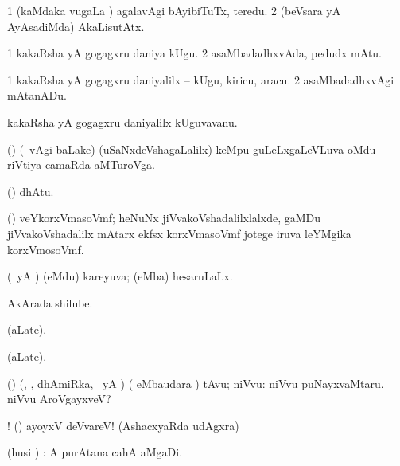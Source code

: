 \bentry
{} 
\gl{\kirxvi} 
\bmng
\bnum
\num{1} (kaMdaka \mo vugaLa \vi) agalavAgi bAyibiTuTx, teredu. 
\num{2} (beVsara yA AyAsadiMda) AkaLisutAtx.
\enum
\emng
\eentry

\bentry
{} 
\gl{\nA} 
\bmng
\bnum
\num{1} kakaRsha yA gogagxru daniya kUgu. 
\num{2} asaMbadadhxvAda, pedudx  mAtu.
\enum
\emng
\eentry

\bentry
{} 
\gl{\akirx} 
\bmng
\bnum
\num{1} kakaRsha yA gogagxru daniyalilx -- kUgu, kiricu, aracu. 
\num{2} asaMbadadhxvAgi mAtanADu.
\enum
\emng 
\eentry

\bentry
{} 
\gl{\nA} 
\bmng
kakaRsha yA gogagxru daniyalilx kUguvavanu.
\emng
\eentry

\bentry
{} 
\gl{\nA} 
\bmng
(\bava) (\sA\  \Eva vAgi baLake) (uSaNxdeVshagaLalilx) keMpu guLeLxgaLeVLuva oMdu riVtiya camaRda aMTuroVga.
\emng
\eentry

\bentry
{}
\gl{\saMkeV}
\bmng
(\ravi)  dhAtu.
\emng
\eentry

\bentry
{} 
\gl{\nA}
\bmng
(\jiVvi) veYkorxVmasoVmf; heNuNx jiVvakoVshadalilxlalxde, gaMDu jiVvakoVshadalilx mAtarx  ekfsx korxVmasoVmf jotege iruva leYMgika korxVmosoVmf.
\emng
\eentry

\bentry
{} 
\gl{\gu}
\bmng
(\pArxparx\ yA \hA) (eMdu) kareyuva; (eMba) hesaruLaLx.
\emng
\eentry

\bentry
{} 
\gl{\nA} 
\bmng
{} AkArada shilube.
\emng
\eentry

\bentry
{}
\gl{\saMkiSx}
\bmng
{} (aLate).
\emng
\eentry

\bentry
{}
\gl{\saMkiSx}
\bmng
{} (aLate).
\emng
\eentry

\bentry
{} 
\gl{\sanA} 
\bmng
(\bava) (\kAparx, \pArxparx, dhAmiRka, \pArxM\ yA \hA)
( eMbaudara \bava) tAvu; niVvu:   niVvu puNayxvaMtaru.  niVvu AroVgayxveV?
\emng

\noindent
\gl{\pagu}
\bmng
{}! (\hA) ayoyxV deVvareV! (AshacxyaRda udAgxra)
\emng
\eentry

\bentry
{} 
\gl{\gu}
\bmng
(husi \pArxparx) :  A purAtana cahA aMgaDi. 
\emng 
\eentry

